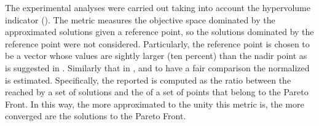 %
%
%
%
%
%
%


The experimental analyses were carried out taking into account the hypervolume indicator (\HV{}).
%
The \HV{} metric measures the objective space dominated by the approximated solutions given a reference point, so the solutions dominated by the reference point were not considered.
%
Particularly, the reference point is chosen to be a vector whose values are sightly larger (ten percent) than the nadir point as is suggested in \cite{ishibuchi2017reference}.
%
Similarly that in \cite{li2015evolutionary}, and to have a fair comparison the normalized \HV{} is estimated.
%
Specifically, the \HV{} reported is computed as the ratio between the \HV{} reached by a set of solutions and the \HV{} of a set of points that belong to the Pareto Front.
%
In this way, the more approximated to the unity this metric is, the more converged are the solutions to the Pareto Front.
%



